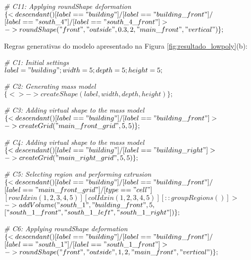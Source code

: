\noindent \textit{\# C11: Applying roundShape deformation}\\
$\{< descendant() [label=="building"] / [label=="building\_front"] / $\\
$[label=="south\_4"] / [label=="south\_4\_front"] > $\\
$-> roundShape("front", "outside", 0.3, 2, "main\_front", "vertical")\};$

\vspace{1cm}

Regras generativas do modelo apresentado na Figura \ref{fig:resultado_lowpoly}(b):

\noindent \textit{\# C1: Initial settings}\\
$label = "building"; width = 5; depth = 5; height = 5;$

\noindent \textit{\# C2: Generating mass model}\\
$\{<> -> createShape(label, width, depth, height)\};$

\noindent \textit{\# C3: Adding virtual shape to the mass model}\\
$\{< descendant() [label=="building"] / [label=="building\_front"] > $\\
$-> createGrid("main\_front\_grid", 5, 5)\};$

\noindent \textit{\# C4: Adding virtual shape to the mass model}\\
$\{< descendant() [label=="building"] / [label=="building\_right"] > $\\
$-> createGrid("main\_right\_grid", 5, 5)\};$

\noindent \textit{\# C5: Selecting region and performing extrusion}\\
$\{< descendant() [label=="building"] / [label=="building\_front"] / $\\
$[label=="main\_front\_grid"] / [type=="cell"] $\\
$[rowIdx in (1, 2, 3, 4, 5)] [colIdx in (1, 2, 3, 4, 5)] [::groupRegions()] > $\\
$-> addVolume("south\_1", "building\_front", 5, $\\
$["south\_1\_front", "south\_1\_left", "south\_1\_right"])\};$

\noindent \textit{\# C6: Applying roundShape deformation}\\
$\{< descendant() [label=="building"] / [label=="building\_front"] / $\\
$[label=="south\_1"] / [label=="south\_1\_front"] > $\\
$-> roundShape("front", "outside", 1, 2, "main\_front", "vertical")\};$


